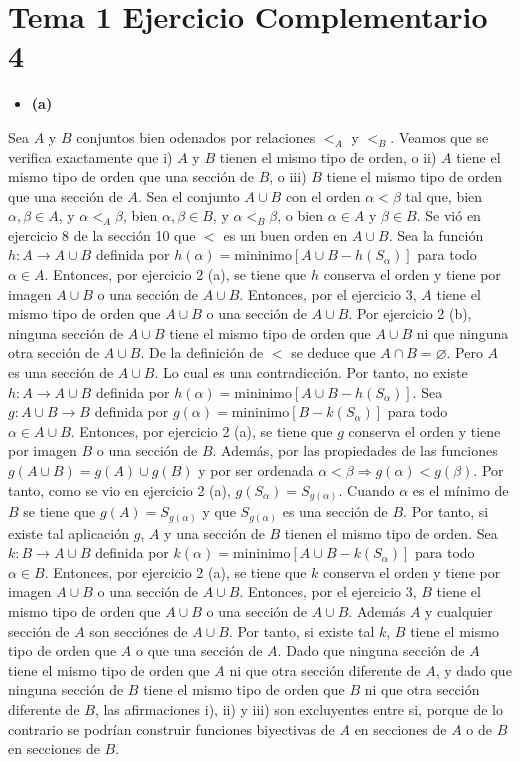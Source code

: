 \documentclass{article}
\begin{document}
\section{Tema 1 Ejercicio Complementario 4}
\begin{itemize}
\item \bf (a)\rm
\end{itemize}
Sea $A$ y $B$ conjuntos bien odenados por relaciones $<_A$ y $<_B$. Veamos que se verifica exactamente que i) $A$ y $B$ tienen el mismo tipo de orden, o ii) $A$ tiene el mismo tipo de orden que una sección de $B$, o iii) $B$ tiene el mismo tipo de orden que una sección de $A$. Sea el conjunto $A\cup B$ con el orden $\alpha<\beta$ tal que, bien $\alpha,\beta\in A$, y $\alpha<_A \beta$, bien $\alpha,\beta\in B$, y $\alpha<_B \beta$, o bien $\alpha\in A$ y $\beta\in B$. Se vió en ejercicio 8 de la sección 10 que $<$ es un buen orden en $A\cup B$. Sea la función $h:A\rightarrow A\cup B$ definida por  $h(\alpha)=\text{mininimo}[A\cup B-h(S_\alpha)]$ para todo $\alpha \in A$. Entonces, por ejercicio 2 (a), se tiene que $h$ conserva el orden y tiene por imagen $A\cup B$ o una sección de $A\cup B$. Entonces, por el ejercicio 3, $A$ tiene el mismo tipo de orden que $A\cup B$ o una sección de $A\cup B$. Por ejercicio 2 (b), ninguna sección de $A\cup B$ tiene el mismo tipo de orden que $A\cup B$ ni que ninguna otra sección de $A\cup B$. De la definición de $<$ se deduce que $A\cap B=\varnothing$. Pero $A$ es una sección de $A\cup B$. Lo cual es una contradicción. Por tanto, no existe $h:A\rightarrow A\cup B$ definida por  $h(\alpha)=\text{mininimo}[A\cup B-h(S_\alpha)]$. Sea $g:A\cup B \rightarrow B$ definida por $g(\alpha)=\text{mininimo}[B-k(S_\alpha)]$ para todo $\alpha \in A\cup B$. Entonces, por ejercicio 2 (a), se tiene que $g$ conserva el orden y tiene por imagen $B$ o una sección de $B$. Además, por las propiedades de las funciones $g(A\cup B)=g(A)\cup g(B)$ y por ser ordenada $\alpha<\beta \Rightarrow g(\alpha)<
g(\beta)$. Por tanto, como se vio en ejercicio 2 (a), $g(S_\alpha)=S_{g(\alpha)}$. Cuando $\alpha$ es el mínimo de $B$ se tiene que  $g(A)=S_{g(\alpha)}$ y que $S_{g(\alpha)}$ es una sección de $B$. Por tanto, si existe tal aplicación $g$, $A$ y una sección de $B$ tienen el mismo tipo de orden. Sea $k:B \rightarrow A\cup B$ definida por  $k(\alpha)=\text{mininimo}[A\cup B-k(S_\alpha)]$ para todo $\alpha \in B$. Entonces, por ejercicio 2 (a), se tiene que $k$ conserva el orden y tiene por imagen $A\cup B$ o una sección de $A\cup B$. Entonces, por el ejercicio 3, $B$ tiene el mismo tipo de orden que $A\cup B$ o una sección de $A\cup B$. Además $A$ y cualquier sección de $A$ son secciónes de $A\cup B$. Por tanto, si existe tal $k$, $B$ tiene el mismo tipo de orden que $A$ o que una sección de $A$. Dado que ninguna sección de $A$ tiene el mismo tipo de orden que $A$ ni que otra sección diferente de $A$, y dado que ninguna sección de $B$ tiene el mismo tipo de orden que $B$ ni que otra sección diferente de $B$, las afirmaciones i), ii) y iii) son excluyentes entre si, porque de lo contrario se podrían construir funciones biyectivas de $A$ en secciones de $A$ o de $B$ en secciones de $B$.
\end{document}
